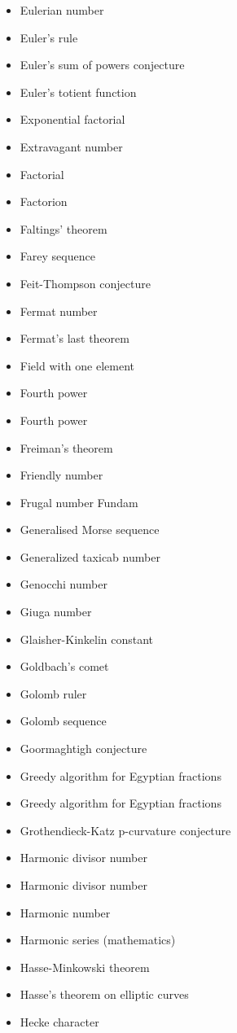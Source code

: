 \documentclass[12pt]{article}
\begin{document}
\begin{itemize}
\item Eulerian number 
\item Euler's rule 
\item Euler's sum of powers conjecture 
\item Euler's totient function 
\item Exponential factorial 
\item Extravagant number 
\item Factorial 
\item Factorion 
\item Faltings' theorem 
\item Farey sequence 
\item Feit-Thompson conjecture 
\item Fermat number 
\item Fermat's last theorem 
\item Field with one element 
\item Fourth power 
\item Fourth power 
\item Freiman's theorem 
\item Friendly number 
\item Frugal number Fundam
\item Generalised Morse sequence 
\item Generalized taxicab number 
\item Genocchi number 
\item Giuga number 
\item Glaisher-Kinkelin constant 
\item Goldbach's comet 
\item Golomb ruler 
\item Golomb sequence 
\item Goormaghtigh conjecture 
\item Greedy algorithm for Egyptian fractions 
\item Greedy algorithm for Egyptian fractions 
\item Grothendieck-Katz p-curvature conjecture 
\item Harmonic divisor number 
\item Harmonic divisor number 
\item Harmonic number 
\item Harmonic series (mathematics) 
\item Hasse-Minkowski theorem 
\item Hasse's theorem on elliptic curves 
\item Hecke character 

\end{itemize}
\end{document}
